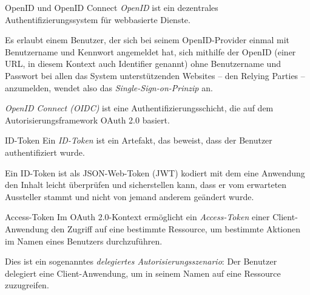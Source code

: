 \begin{bonus}{OpenID und OpenID Connect}
    \emph{OpenID} ist ein dezentrales Authentifizierungssystem für webbasierte Dienste.

    Es erlaubt einem Benutzer, der sich bei seinem OpenID-Provider einmal mit Benutzername und Kennwort angemeldet hat, sich mithilfe der OpenID (einer URL, in diesem Kontext auch Identifier genannt) ohne Benutzername und Passwort bei allen das System unterstützenden Websites – den Relying Parties – anzumelden, wendet also das \emph{Single-Sign-on-Prinzip} an.

    \emph{OpenID Connect (OIDC)} ist eine Authentifizierungsschicht, die auf dem Autorisierungsframework OAuth 2.0 basiert.
\end{bonus}

\begin{bonus}{ID-Token}
    Ein \emph{ID-Token} ist ein Artefakt, das beweist, dass der Benutzer authentifiziert wurde.

    Ein ID-Token ist als JSON-Web-Token (JWT) kodiert mit dem eine Anwendung den Inhalt leicht überprüfen und sicherstellen kann, dass er vom erwarteten Aussteller stammt und nicht von jemand anderem geändert wurde.
\end{bonus}

\begin{bonus}{Access-Token}
    Im OAuth 2.0-Kontext ermöglicht ein \emph{Access-Token} einer Client-Anwendung den Zugriff auf eine bestimmte Ressource, um bestimmte Aktionen im Namen eines Benutzers durchzuführen.

    Dies ist ein sogenanntes \emph{delegiertes Autorisierungsszenario}:
    Der Benutzer delegiert eine Client-Anwendung, um in seinem Namen auf eine Ressource zuzugreifen.
\end{bonus}